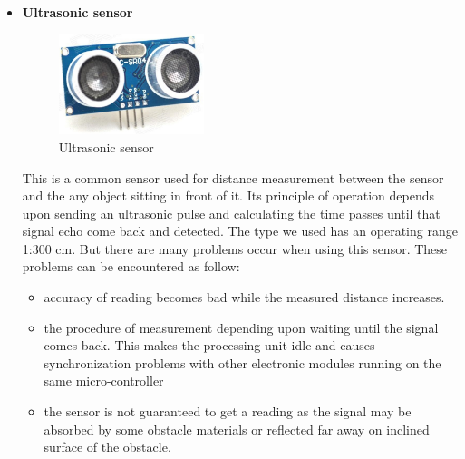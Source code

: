 \documentclass[12pt]{article}
\begin{document}
\begin{itemize}
	\item \textbf{Ultrasonic sensor}\\
		\begin{figure}[H]
		\centering
		\includegraphics[width =0.4\textwidth]{Fig/Electronics/ultrasonic.jpg}
		\caption{Ultrasonic sensor}
		\label{fig:ultrasonic}
	\end{figure}
	This is a common sensor used for distance measurement between the sensor and the any object sitting in front of it. Its principle of operation depends upon sending an ultrasonic pulse and calculating the time passes until that signal echo come back and detected. The type we used has an operating range 1:300 cm. But there are many problems occur when using this sensor. These problems can be encountered as follow:
	\begin{itemize}
		\item accuracy of reading becomes bad while the measured distance increases.
		\item the procedure of measurement depending upon waiting until the signal comes back. This makes the processing unit idle and causes synchronization problems with other electronic modules running on the same micro-controller
		\item the sensor is not guaranteed to get a reading as the signal may be absorbed by some obstacle materials or reflected far away on inclined surface of the obstacle.  
	\end{itemize} 


\end{itemize}
\end{document}
